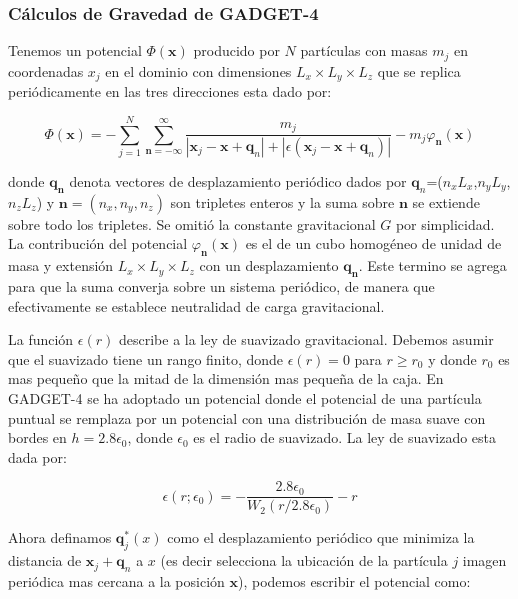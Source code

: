 \subsubsection{Cálculos de Gravedad de GADGET-4}

Tenemos un potencial $\Phi (\mathbf{x})$ producido por $N$ partículas con masas $m_j$ en coordenadas $x_j$ en el dominio con dimensiones $L_x \times L_y \times L_z$ que se replica periódicamente en las tres direcciones esta dado por:

\begin{equation}
    \Phi (\mathbf{x}) = - \sum_{j=1}^{N} \sum_{\mathbf{n}=-\infty}^{\infty}  \frac{ m_j }{ |\mathbf{x}_j - \mathbf{x} + \mathbf{q}_n| + |\epsilon ( \mathbf{x}_j - \mathbf{x} + \mathbf{q}_n)| }   - m_j\varphi_{\mathbf{n}}(\mathbf{x})
    \label{eq:Grav_Pot_1}
\end{equation}

\noindent donde $\mathbf{q_n}$ denota vectores de desplazamiento periódico dados por $\mathbf{q}_n$=($n_x$$L_x$,$ n_y$$L_y$,$n_z$$L_z$) y $\mathbf{n} = (n_x, n_y, n_z)$ son tripletes enteros y la suma sobre $\mathbf{n}$ se extiende sobre todo los tripletes. Se omitió la constante gravitacional $G$ por simplicidad. La contribución del potencial $\varphi_{\mathbf{n}}(\mathbf{x})$ es el de un cubo homogéneo de unidad de masa y extensión $L_x \times L_y \times L_z$ con un desplazamiento $\mathbf{q_n}$. Este termino se agrega para que la suma converja sobre un sistema periódico, de manera que efectivamente se establece neutralidad de carga gravitacional.

La función $\epsilon(r)$ describe a la ley de suavizado gravitacional. Debemos asumir que el suavizado tiene un rango finito, donde $\epsilon(r)=0$ para $r\geq r_0$ y donde $r_0$ es mas pequeño que la mitad de la dimensión mas pequeña de la caja. En GADGET-4 se ha adoptado un potencial donde el potencial de una partícula puntual se remplaza por un potencial con una distribución de masa suave con bordes en $h=2.8\epsilon_0$, donde $\epsilon_0$ es el radio de suavizado. La ley de suavizado esta dada por:

\begin{equation}
    \epsilon(r;\epsilon_0) = - \frac{2.8\epsilon_0}{W_2(r/2.8\epsilon_0)} -r
    \label{eq:Ley-Suavizado}
\end{equation}

Ahora definamos $\mathbf{q}^*_j(x)$ como el desplazamiento periódico que minimiza la distancia de $\mathbf{x}_j+\mathbf{q}_n$ a $x$ (es decir selecciona la ubicación de la partícula $j$ imagen periódica mas cercana a la posición $\mathbf{x}$), podemos escribir el potencial como:

